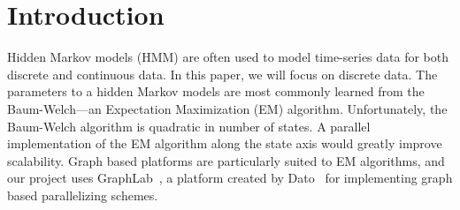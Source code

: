 \section{Introduction}

Hidden Markov models (HMM) are often used to model time-series data for both
discrete and continuous data. In this paper, we will focus on discrete data. The
parameters to a hidden Markov models are most commonly learned from the
Baum-Welch---an Expectation Maximization (EM) algorithm. Unfortunately, the
Baum-Welch algorithm is quadratic in number of states. A parallel implementation
of the EM algorithm along the state axis would greatly improve scalability.
Graph based platforms are particularly suited to EM algorithms, and our project
uses GraphLab~\cite{graphlab}, a platform created by Dato~\cite{dato} for implementing graph based parallelizing schemes. 
